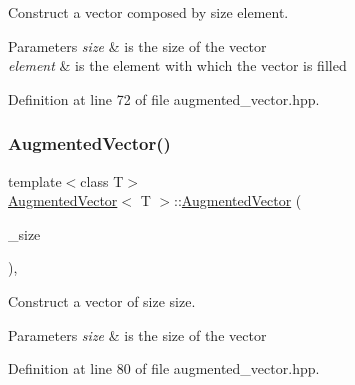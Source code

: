 Construct a vector composed by size element. 


\begin{DoxyParams}{Parameters}
{\em size} & is the size of the vector \\
\hline
{\em element} & is the element with which the vector is filled \\
\hline
\end{DoxyParams}


Definition at line 72 of file augmented\+\_\+vector.\+hpp.

\mbox{\label{classAugmentedVector_abefeb4bc59b74b09a100593bb4d6a985}} 
\subsubsection{\texorpdfstring{Augmented\+Vector()}{AugmentedVector()}\hspace{0.1cm}{\footnotesize\ttfamily [3/4]}}
{\footnotesize\ttfamily template$<$class T$>$ \\
\hyperlink{classAugmentedVector}{Augmented\+Vector}$<$ T $>$\+::\hyperlink{classAugmentedVector}{Augmented\+Vector} (\begin{DoxyParamCaption}\item[{const \hyperlink{tutorial__fpt__2017_2intro_2sixth_2test_8c_a7c94ea6f8948649f8d181ae55911eeaf}{size\+\_\+t}}]{\+\_\+size }\end{DoxyParamCaption})\hspace{0.3cm}{\ttfamily [inline]}, {\ttfamily [explicit]}}



Construct a vector of size size. 


\begin{DoxyParams}{Parameters}
{\em size} & is the size of the vector \\
\hline
\end{DoxyParams}


Definition at line 80 of file augmented\+\_\+vector.\+hpp.

\mbox{\label{classAugmentedVector_aa8878191d740720303ba47ee5ea9a578}} 
